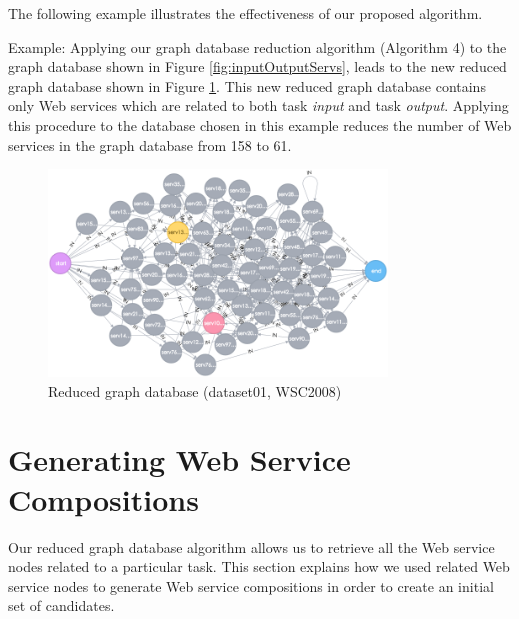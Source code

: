 The following example illustrates the effectiveness of our proposed algorithm.

Example: Applying our graph database reduction algorithm (Algorithm 4) to the graph database shown in Figure \ref{fig:inputOutputServs}, leads to the new reduced graph database shown in Figure \ref{fig:reduced}. This new reduced graph database contains only Web services which are related to both task \emph{input} and task \emph{output}. Applying this procedure to the database chosen in this example reduces the number of Web services in the graph database from 158 to 61.

\begin{figure}[H]
\includegraphics[width=9cm]{Reduced-graph-database.png}
\centering
\caption{Reduced graph database (dataset01, WSC2008)}
\label{fig:reduced} 
\end{figure} 

\section{Generating Web Service Compositions} \label{generatingComp}
Our reduced graph database algorithm allows us to retrieve all the Web service nodes related to a particular task. This section explains how we used related Web service nodes to generate Web service compositions in order to create an initial set of candidates.\par

